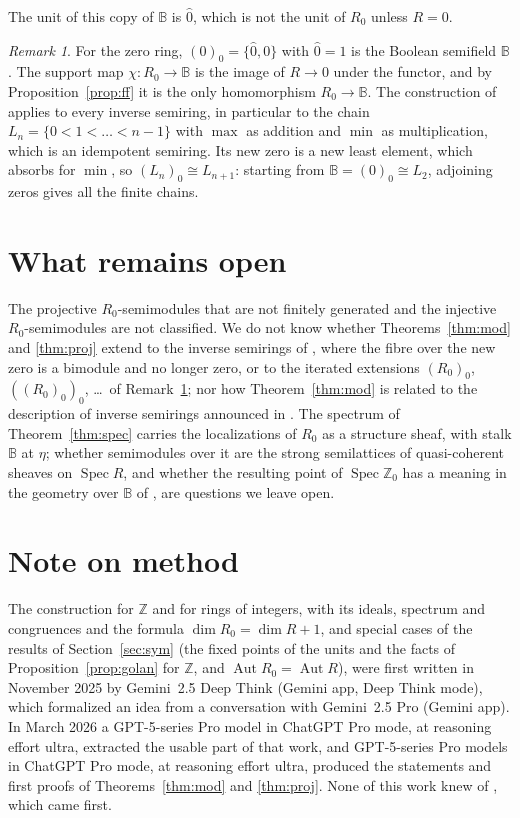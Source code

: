 \documentclass[11pt]{amsart}
\theoremstyle{remark}
\newtheorem{remark}[thm]{Remark}
\newcommand{\B}{\mathbb B}
\newcommand{\oz}{\widehat{0}}
\DeclareMathOperator{\Spec}{Spec}
\begin{document}
The unit of this copy of $\B$ is $\oz$, which is not the unit of $R_0$ unless $R=0$.

\begin{remark}\label{rem:chains}
For the zero ring, $(0)_0=\{\oz,0\}$ with $\oz=1$ is the Boolean semifield $\B$. The support map $\chi\colon R_0\to\B$ is the image of $R\to0$ under the functor, and by Proposition~\ref{prop:ff} it is the only homomorphism $R_0\to\B$. The construction of \cite[Definition 3.6]{FGJM} applies to every inverse semiring, in particular to the chain $L_n=\{0<1<\dots<n-1\}$ with $\max$ as addition and $\min$ as multiplication, which is an idempotent semiring. Its new zero is a new least element, which absorbs for $\min$, so $(L_n)_0\cong L_{n+1}$: starting from $\B=(0)_0\cong L_2$, adjoining zeros gives all the finite chains.
\end{remark}

\section{What remains open}
The projective $R_0$-semimodules that are not finitely generated and the injective $R_0$-semimodules are not classified. We do not know whether Theorems~\ref{thm:mod} and \ref{thm:proj} extend to the inverse semirings of \cite[Construction 3.5]{FGJM}, where the fibre over the new zero is a bimodule and no longer zero, or to the iterated extensions $(R_0)_0$, $((R_0)_0)_0$, \dots\ of Remark~\ref{rem:chains}; nor how Theorem~\ref{thm:mod} is related to the description of inverse semirings announced in \cite[\S7]{FGJM}. The spectrum of Theorem~\ref{thm:spec} carries the localizations of $R_0$ as a structure sheaf, with stalk $\B$ at $\eta$; whether semimodules over it are the strong semilattices of quasi-coherent sheaves on $\Spec R$, and whether the resulting point of $\Spec\mathbb Z_0$ has a meaning in the geometry over $\B$ of \cite{CC}, are questions we leave open.

\section*{Note on method}
The construction for $\mathbb Z$ and for rings of integers, with its ideals, spectrum and congruences and the formula $\dim R_0=\dim R+1$, and special cases of the results of Section~\ref{sec:sym} (the fixed points of the units and the facts of Proposition~\ref{prop:golan} for $\mathbb Z$, and $\operatorname{Aut}R_0=\operatorname{Aut}R$), were first written in November 2025 by Gemini~2.5 Deep Think (Gemini app, Deep Think mode), which formalized an idea from a conversation with Gemini~2.5 Pro (Gemini app). In March 2026 a GPT-5-series Pro model in ChatGPT Pro mode, at reasoning effort ultra, extracted the usable part of that work, and GPT-5-series Pro models in ChatGPT Pro mode, at reasoning effort ultra, produced the statements and first proofs of Theorems~\ref{thm:mod} and \ref{thm:proj}. None of this work knew of \cite{FGJM}, which came first.
\end{document}
